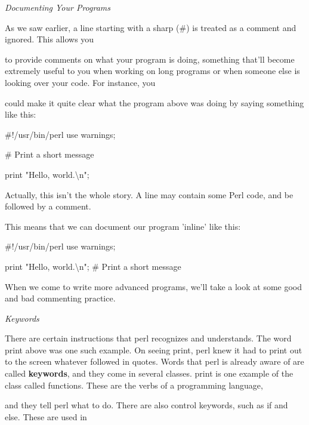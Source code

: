 \documentclass[a4paper,11pt]{book}
\begin{document}
\noindent 

\noindent \textit{Documenting Your Programs}

\noindent As we saw earlier, a line starting with a sharp (\#) is treated as a comment and ignored. This allows you

\noindent to provide comments on what your program is doing, something that'll become extremely useful to you when working on long programs or when someone else is looking over your code. For instance, you

\noindent could make it quite clear what the program above was doing by saying something like this:

\noindent 

\noindent \#!/usr/bin/perl use warnings;

\noindent 

\noindent \# Print a short message

\noindent print "Hello, world.\textbackslash n";

\noindent 

\noindent 

\noindent Actually, this isn't the whole story. A line may contain some Perl code, and be followed by a comment.

\noindent This means that we can document our program 'inline' like this:

\noindent 

\noindent 

\noindent \#!/usr/bin/perl use warnings;

\noindent 

\noindent print "Hello, world.\textbackslash n"; \# Print a short message

\noindent 

\noindent When we come to  write  more  advanced  programs,  we'll  take  a  look at  some  good  and  bad commenting practice.

\noindent 

\noindent \textit{Keywords}

\noindent There are certain instructions that perl recognizes and understands. The word print above was one such example. On seeing print, perl knew it had to print out to the screen whatever followed in quotes. Words that perl is already aware of are called \textbf{keywords}, and they come in several classes. print is one example of the class called functions.  These are the verbs of a programming language,

\noindent and they tell perl what to do. There are also control keywords, such as if and else. These are used in
\end{document}
